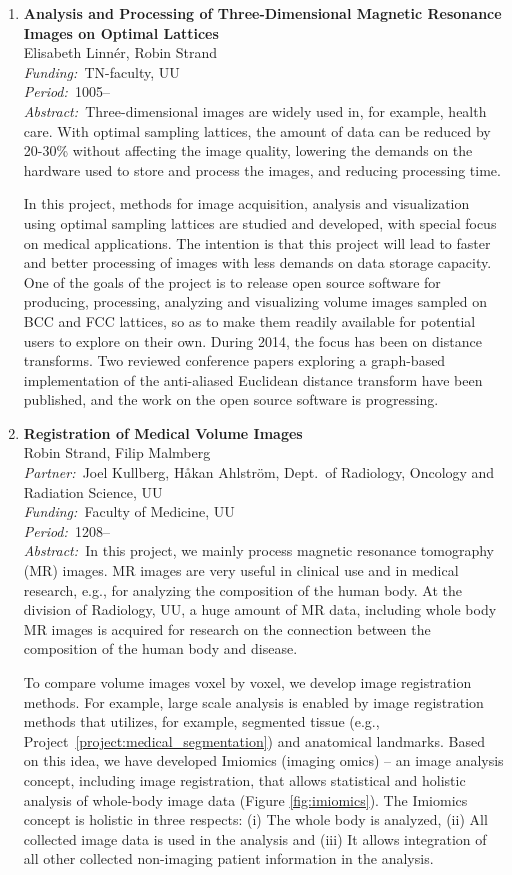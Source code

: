 \documentclass[10pt, a4paper]{article}
\newcommand{\aabstract}[1]{\emph{Abstract:~}#1}
\newcommand{\ffunding}[1]{\emph{Funding:~}#1\\}
\newcommand{\ppartner}[1]{\emph{Partner:~}#1\\}
\newcommand{\pperiod}[1]{\emph{Period:~}#1\\}
\begin{document}
{\begin{enumerate}
\item 
\label{proj:MRI_optimal_lattices}
\textbf{Analysis and Processing of Three-Dimensional Magnetic Resonance Images on Optimal Lattices} \\
Elisabeth Linn\'{e}r, Robin Strand\\
\ffunding{TN-faculty, UU}
\pperiod{1005--}
\aabstract{Three-dimensional images are widely used in, for example, health care. With optimal sampling lattices, the amount of data can be reduced by 20-30\% without affecting the image quality, lowering the demands on the hardware used to store and process the images, and reducing processing time.

In this project, methods for image acquisition, analysis and visualization using optimal sampling lattices are studied and developed, with special focus on medical applications. The intention is that this project will lead to faster and better processing of images with less demands on data storage capacity. One of the goals of the project is to release open source software for producing, processing, analyzing and visualizing volume images sampled on BCC and FCC lattices, so as to make them readily available for potential users to explore on their own.
During 2014, the focus has been on distance transforms. Two reviewed conference papers exploring a graph-based implementation of the anti-aliased Euclidean distance transform have been published, and the work on the open source software is progressing.}


\item 
\label{proj:MRI_registration}
\textbf{Registration of Medical Volume Images}\\
Robin Strand, Filip Malmberg\\
\ppartner{Joel Kullberg, H{\aa}kan Ahlstr\"{o}m, Dept.~of Radiology, Oncology and Radiation Science, UU}
\ffunding{Faculty of Medicine, UU}
\pperiod{1208--}
\aabstract{In this project, we mainly process magnetic resonance tomography (MR) images. MR images are very useful in clinical use and in medical research, e.g., for analyzing the composition of the human body. At the division of Radiology, UU, a huge amount of MR data, including whole body MR images is acquired for research on the connection between the composition of the human body and disease.

To compare volume images voxel by voxel, we develop image registration methods. For example, large scale analysis is enabled by image registration methods that utilizes, for example, segmented tissue (e.g., Project~\ref{project:medical_segmentation}) and anatomical landmarks. Based on this idea, we have developed Imiomics (imaging omics) -- an image analysis concept, including image registration, that allows statistical and holistic analysis of whole-body image data (Figure \ref{fig:imiomics}). The Imiomics concept is holistic in three respects: (i) The whole body is analyzed, (ii) All collected image data is used in the analysis and (iii) It allows integration of all other collected non-imaging patient information in the analysis.}


\end{enumerate}}
\end{document}
